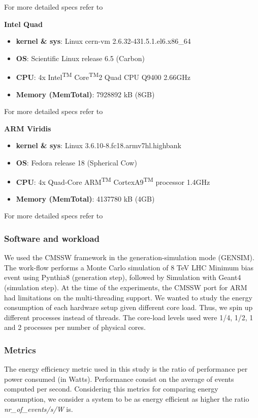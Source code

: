 For more detailed specs refer to \cite{atom_specs}

\vspace{10mm}
\textbf{Intel Quad}
\begin{itemize}
  \item[] \textbf{kernel \& sys}:  Linux cern-vm 2.6.32-431.5.1.el6.x86\_64
  \item[] \textbf{OS}: Scientific Linux release 6.5 (Carbon)
  \item[] \textbf{CPU}:    4x Intel\textsuperscript{TM} Core\textsuperscript{TM}2 Quad CPU  Q9400  \@ 2.66GHz
  \item[] \textbf{Memory  (MemTotal)}:        7928892 kB (8GB)
\end{itemize}

For more detailed specs refer to \cite{quad_specs}

\vspace{10mm}
\textbf{ARM Viridis}
\begin{itemize}
  \item[] \textbf{kernel \& sys}:  Linux  3.6.10-8.fc18.armv7hl.highbank
  \item[] \textbf{OS}: Fedora release 18 (Spherical Cow)
  \item[] \textbf{CPU}:    4x Quad-Core ARM\textsuperscript{TM} CortexA9\textsuperscript{TM} processor \@1.4GHz
  \item[] \textbf{Memory  (MemTotal)}:        4137780 kB (4GB) 
\end{itemize}

For more detailed specs refer to \cite{viridis_specs}


\subsubsection*{Software and workload}
We used the CMSSW framework in the generation-simulation mode (GEN\-SIM). The work-flow performs a Monte Carlo simulation of 8 TeV LHC Minimum bias event using Pynthia8 (generation step), followed by Simulation with Geant4 (simulation step).
At the time of the experiments, the CMSSW port for ARM had limitations on the multi-threading support. We wanted to study the energy consumption of each hardware setup given different core load. Thus, we spin up different processes instead of threads. The core-load levels used were 1/4, 1/2, 1 and 2 processes per number of physical cores. 

\subsubsection*{Metrics}
The energy efficiency metric used in this study is the ratio of performance per power consumed (in Watts). Performance consist on the average of events computed per second. Considering this metrics for comparing energy consumption, we consider a system to be as energy efficient as higher the ratio \textit{nr\_of\_events/s/W} is.


